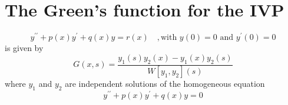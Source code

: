 \documentclass[12pt,a4paper]{article}
\begin{document}
\section{The Green’s function for the IVP}
\begin{equation}
	y^{\prime \prime} +p(x)y^\prime +q(x)y=r(x) \quad,   \text{with } y(0)=0 \text{ and }   y^\prime(0)=0
	\label{eq:1}
\end{equation}
is given by
\begin{equation}
   G(x,s) = \frac{y_1(s)y_2(x) - y_1(x)y_2(s)}{W[y_1,y_2](s)}
   \label{eq:2}
\end{equation}
where $ y_1$ and $ y_2$ are independent solutions of the homogeneous equation
\begin{equation}
	y^{\prime \prime} + p(x)y^\prime + q(x)y = 0
	\label{eq:3}
\end{equation}
\end{document}
